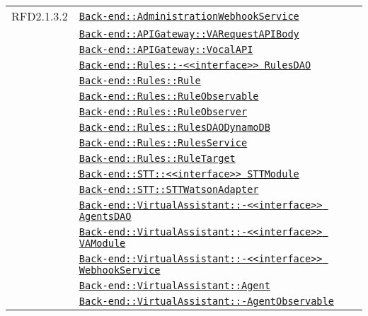 \begin{longtable}{|>{\centering}m{3cm}|m{10cm}<{\centering}|}
RFD2.1.3.2 & \hyperref[Back-end::AdministrationWebhookService]{\texttt{Back-end::AdministrationWebhookService}}\\
& \hyperref[Back-end::APIGateway::VARequestAPIBody]{\texttt{Back-end::APIGateway::VARequestAPIBody}}\\
& \hyperref[Back-end::APIGateway::VocalAPI]{\texttt{Back-end::APIGateway::VocalAPI}}\\
& \hyperref[Back-end::Rules::<<interface>> RulesDAO]{\texttt{Back-end::Rules::-\linebreak <<interface>> RulesDAO}}\\
& \hyperref[Back-end::Rules::Rule]{\texttt{Back-end::Rules::Rule}}\\
& \hyperref[Back-end::Rules::RuleObservable]{\texttt{Back-end::Rules::RuleObservable}}\\
& \hyperref[Back-end::Rules::RuleObserver]{\texttt{Back-end::Rules::RuleObserver}}\\
& \hyperref[Back-end::Rules::RulesDAODynamoDB]{\texttt{Back-end::Rules::RulesDAODynamoDB}}\\
& \hyperref[Back-end::Rules::RulesService]{\texttt{Back-end::Rules::RulesService}}\\
& \hyperref[Back-end::Rules::RuleTarget]{\texttt{Back-end::Rules::RuleTarget}}\\
& \hyperref[Back-end::STT::<<interface>> STTModule]{\texttt{Back-end::STT::<<interface>> STTModule}}\\
& \hyperref[Back-end::STT::STTWatsonAdapter]{\texttt{Back-end::STT::STTWatsonAdapter}}\\
& \hyperref[Back-end::VirtualAssistant::<<interface>> AgentsDAO]{\texttt{Back-end::VirtualAssistant::-\linebreak <<interface>> AgentsDAO}}\\
& \hyperref[Back-end::VirtualAssistant::<<interface>> VAModule]{\texttt{Back-end::VirtualAssistant::-\linebreak <<interface>> VAModule}}\\
& \hyperref[Back-end::VirtualAssistant::<<interface>> WebhookService]{\texttt{Back-end::VirtualAssistant::-\linebreak <<interface>> WebhookService}}\\
& \hyperref[Back-end::VirtualAssistant::Agent]{\texttt{Back-end::VirtualAssistant::Agent}}\\
& \hyperref[Back-end::VirtualAssistant::AgentObservable]{\texttt{Back-end::VirtualAssistant::-\linebreak AgentObservable}}\\

\end{longtable}
